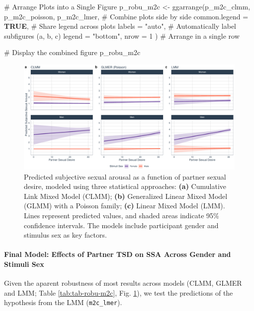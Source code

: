 \documentclass[
  bookmarksnumbered]{article}
\newenvironment{Shaded}{\begin{snugshade}}{\end{snugshade}}
\newcommand{\AttributeTok}[1]{\textcolor[rgb]{0.80,0.80,0.80}{#1}}
\newcommand{\CommentTok}[1]{\textcolor[rgb]{0.50,0.62,0.50}{#1}}
\newcommand{\ConstantTok}[1]{\textcolor[rgb]{0.86,0.64,0.64}{\textbf{#1}}}
\newcommand{\DecValTok}[1]{\textcolor[rgb]{0.86,0.86,0.80}{#1}}
\newcommand{\FunctionTok}[1]{\textcolor[rgb]{0.94,0.94,0.56}{#1}}
\newcommand{\NormalTok}[1]{\textcolor[rgb]{0.80,0.80,0.80}{#1}}
\newcommand{\OtherTok}[1]{\textcolor[rgb]{0.94,0.94,0.56}{#1}}
\newcommand{\StringTok}[1]{\textcolor[rgb]{0.80,0.58,0.58}{#1}}
\begin{document}
\begin{Shaded}
\begin{Highlighting}[]
\CommentTok{\# Arrange Plots into a Single Figure}
\NormalTok{p\_robu\_m2c }\OtherTok{\textless{}{-}} \FunctionTok{ggarrange}\NormalTok{(p\_m2c\_clmm, p\_m2c\_poisson, p\_m2c\_lmer, }\CommentTok{\# Combine plots side by side}
  \AttributeTok{common.legend =} \ConstantTok{TRUE}\NormalTok{, }\CommentTok{\# Share legend across plots}
  \AttributeTok{labels =} \StringTok{"auto"}\NormalTok{, }\CommentTok{\# Automatically label subfigures (a, b, c)}
  \AttributeTok{legend =} \StringTok{"bottom"}\NormalTok{,}
  \AttributeTok{nrow =} \DecValTok{1}
\NormalTok{) }\CommentTok{\# Arrange in a single row}

\CommentTok{\# Display the combined figure}
\NormalTok{p\_robu\_m2c}
\end{Highlighting}
\end{Shaded}

\begin{figure}
\centering
\includegraphics{Sexual_Desire_Arousal_V2_files/figure-latex/preds-m2c-1.pdf}
\caption{\label{fig:preds-m2c}Predicted subjective sexual arousal as a function of partner sexual desire, modeled using three statistical approaches: \textbf{(a)} Cumulative Link Mixed Model (CLMM); \textbf{(b)} Generalized Linear Mixed Model (GLMM) with a Poisson family; \textbf{(c)} Linear Mixed Model (LMM). Lines represent predicted values, and shaded areas indicate 95\% confidence intervals. The models include participant gender and stimulus sex as key factors.}
\end{figure}

\paragraph{Final Model: Effects of Partner TSD on SSA Across Gender and Stimuli Sex}\label{final-model-effects-of-partner-tsd-on-ssa-across-gender-and-stimuli-sex}

Given the aparent robustness of most results across models (CLMM, GLMER and LMM; Table \ref{tab:tab-robu-m2c}, Fig. \ref{fig:preds-m2c}), we test the predictions of the hypothesis from the LMM (\texttt{m2c\_lmer}).
\end{document}
